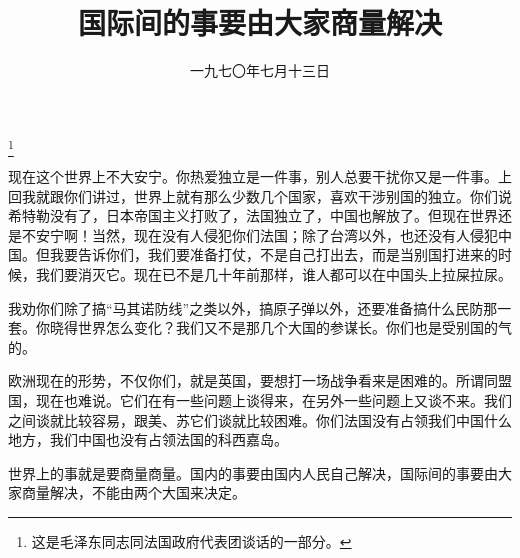 
\title{国际间的事要由大家商量解决}
\date{一九七〇年七月十三日}
\thanks{这是毛泽东同志同法国政府代表团谈话的一部分。}
\maketitle


现在这个世界上不大安宁。你热爱独立是一件事，别人总要干扰你又是一件事。上回我就跟你们讲过，世界上就有那么少数几个国家，喜欢干涉别国的独立。你们说希特勒没有了，日本帝国主义打败了，法国独立了，中国也解放了。但现在世界还是不安宁啊！当然，现在没有人侵犯你们法国；除了台湾以外，也还没有人侵犯中国。但我要告诉你们，我们要准备打仗，不是自己打出去，而是当别国打进来的时候，我们要消灭它。现在已不是几十年前那样，谁人都可以在中国头上拉屎拉尿。

我劝你们除了搞“马其诺防线”之类以外，搞原子弹以外，还要准备搞什么民防那一套。你晓得世界怎么变化？我们又不是那几个大国的参谋长。你们也是受别国的气的。

欧洲现在的形势，不仅你们，就是英国，要想打一场战争看来是困难的。所谓同盟国，现在也难说。它们在有一些问题上谈得来，在另外一些问题上又谈不来。我们之间谈就比较容易，跟美、苏它们谈就比较困难。你们法国没有占领我们中国什么地方，我们中国也没有占领法国的科西嘉岛。

世界上的事就是要商量商量。国内的事要由国内人民自己解决，国际间的事要由大家商量解决，不能由两个大国来决定。
